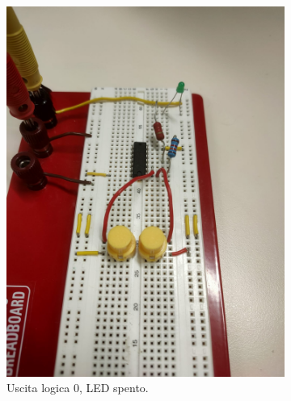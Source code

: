 \documentclass[a4paper,12pt]{article}
\begin{document}
\begin{figure}[h]
	\centering
	\begin{subfigure}[b]{0.45\textwidth}
		\centering
		\includegraphics[width=\linewidth]{immagini/latch/off.png}
		\caption{Uscita logica 0, LED spento.}
	\end{subfigure}
	\quad
	\begin{subfigure}[b]{0.45\textwidth}
		\centering

\end{subfigure}
\end{figure}
\end{document}
